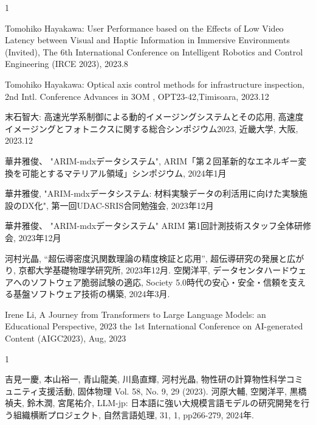 \begin{招待講演}{1}

Tomohiko Hayakawa:  User Performance based on the Effects of Low Video Latency between Visual and Haptic Information in Immersive Environments (Invited), The 6th International Conference on Intelligent Robotics and Control Engineering (IRCE 2023), 2023.8

Tomohiko Hayakawa:  Optical axis control methods for infrastructure inspection, 2nd Intl. Conference Advances in 3OM , OPT23-42,Timisoara, 2023.12


末石智大: 高速光学系制御による動的イメージングシステムとその応用, 高速度イメージングとフォトニクスに関する総合シンポジウム2023, 近畿大学, 大阪, 2023.12


華井雅俊、
"ARIM-mdxデータシステム",
ARIM「第２回革新的なエネルギー変換を可能とするマテリアル領域」シンポジウム,
2024年1月

華井雅俊,
"ARIM-mdxデータシステム: 材料実験データの利活用に向けた実験施設のDX化", 
第一回UDAC-SRIS合同勉強会,
2023年12月

華井雅俊、
"ARIM-mdxデータシステム"
ARIM 第1回計測技術スタッフ全体研修会,
2023年12月

河村光晶,
``超伝導密度汎関数理論の精度検証と応用'',
超伝導研究の発展と広がり,
京都大学基礎物理学研究所,
2023年12月.
空閑洋平, データセンタハードウェアへのソフトウェア脆弱試験の適応, Society 5.0時代の安心・安全・信頼を支える基盤ソフトウェア技術の構築, 2024年3月.


Irene Li, A Journey from Transformers to Large Language Models: an Educational Perspective, 2023 the 1st International Conference on AI-generated Content (AIGC2023), Aug, 2023


\end{招待講演}

\begin{招待論文}{1}

吉見一慶, 本山裕一, 青山龍美, 川島直輝, 河村光晶,
物性研の計算物性科学コミュニティ支援活動,
固体物理 Vol. 58, No. 9, 29 (2023).
河原大輔, 空閑洋平, 黒橋禎夫, 鈴木潤, 宮尾祐介, LLM-jp: 日本語に強い大規模言語モデルの研究開発を行う組織横断プロジェクト, 自然言語処理, 31, 1, pp266-279, 2024年.

\end{招待論文}

